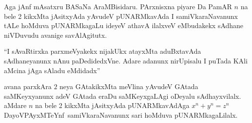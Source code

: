 Aga jAnf mAsatxru BASaNa AraMBisidaru. PArxnisxna piyare Da PamAR $n$ na bele {\rm 2} kikxMta jAsitxyAda yAvudeV pUNARMkavAda I samiVkaraNavanunx tALe hoMduva pUNARMkagaLu ideyeV athavA ilalxveV eMbudakekx sAdhane niVDuvudu avanige savAlAgitutx.

``I sAvaRtirxka parxmeVyakekx nijakUkx atayxMta aduBxtavAda sAdhaneyanunx nAnu paDedidedxVne. Adare adanunx nirUpisalu I puTada KAli aMcina jAga sAladu eMdidadx''

avana parxkAra $2$ neya GAtakikxMta meVlina yAvudeV GAtada saMKeyxyanunx adeV GAtada eraDu saMKeyxgaLAgi oDeyalu sAdhayxvilalx. aMdare $n$ na bele {\rm 2} kikxMta jAsitx\-yAda pUNARMkavAdAga $x^n+y^n=z^n$ DayoVPAyxMTeYnf~samiVkaraNavanunx sari hoMduva pUNARMkagaLilalx.

